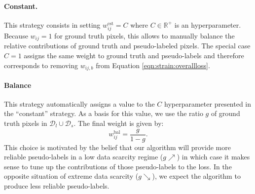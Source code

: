 \paragraph{Constant.} This strategy consists in setting $w^{\text{cst}}_{ij} = C$ where $C \in \mathbb{R}^+$ is an hyperparameter. Because $w_{ij} = 1$ for ground truth pixels, this allows to manually balance the relative contributions of ground truth and pseudo-labeled pixels. The special case $C = 1$ assigns the same weight to ground truth and pseudo-labels and therefore corresponds to removing $w_{ij,b}$ from Equation \ref{eqn:strain:overallloss}.

\paragraph{Balance} This strategy automatically assigns a value to the $C$ hyperparameter presented in the ``constant'' strategy. As a basis for this value, we use the ratio $g$ of ground truth pixels in $\mathcal{D}_l \cup \mathcal{D}_s$. The final weight is given by: 
\begin{equation}
w^{\text{bal}}_{ij} = \frac{g}{1 - g}.
\label{eqn:strain:balancegt}
\end{equation}
This choice is motivated by the belief that our algorithm will provide more reliable pseudo-labels in a low data scarcity regime ($g \nearrow $) in which case it makes sense to tune up the contributions of those pseudo-labels to the loss. In the opposite situation of extreme data scarcity ($g \searrow $), we expect the algorithm to produce less reliable pseudo-labels. 

